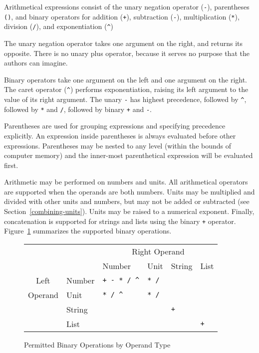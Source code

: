 Arithmetical expressions consist of the unary negation operator
(\verb|-|), parentheses \verb|()|, and binary operators for addition
(\verb|+|), subtraction (\verb|-|), multiplication (\verb|*|),
division (\verb|/|), and exponentiation (\verb|^|)

The unary negation operator takes one argument on the right, and
returns its opposite.  There is no unary plus operator, because it
serves no purpose that the authors can imagine.

Binary operators take one argument on the left and one argument on the
right. The caret operator (\verb|^|) performs exponentiation, raising
its left argument to the value of its right argument. The unary \verb|-| 
has highest precedence, followed by \verb|^|, followed
by \verb|*| and \verb|/|, followed by binary \verb|+| and
\verb|-|.

Parentheses are used for grouping expressions and specifying
precedence explicitly.  An expression inside parentheses is always
evaluated before other expressions.  Parentheses may be nested to any
level (within the bounds of computer memory) and the inner-most
parenthetical expression will be evaluated first.

Arithmetic may be performed on numbers and units.  All arithmetical
operators are supported when the operands are both numbers.  Units may
be multiplied and divided with other units and numbers, but may not be
added or subtracted (see Section~\ref{combining-units}).  Units may be
raised to a numerical exponent.  Finally, concatenation is supported
for strings and lists using the binary \verb|+| operator.
Figure~\ref{binops} summarizes the supported binary operations.

\begin{figure}
\centering%
\begin{tabular}{|cl|l|l|l|l|} \hline
        &         & \multicolumn{4}{c|}{Right Operand} \\
        &         & Number            & Unit             & String           & List \\
\hline
Left    & Number  & \verb|+ - * / ^|  & \verb|* /|       &                  &                  \\
Operand & Unit    & \verb|* / ^|      & \verb|* /|       &                  &                  \\
        & String  &                   &                  & \verb|+|         &                  \\
        & List    &                   &                  &                  & \verb|+|         \\
\hline
\end{tabular}
\caption{Permitted Binary Operations by Operand Type}
\label{binops}
\end{figure}

